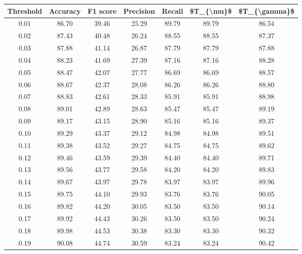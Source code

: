 \begin{tabular}{|c|c|c|c|c|c|c|}
\hline
 Threshold &  Accuracy &  F1 score &  Precision &  Recall &  \$T\_\{\textbackslash mu\}\$ &  \$T\_\{\textbackslash gamma\}\$ \\
\hline
      0.01 &     86.70 &     39.46 &      25.29 &   89.79 &      89.79 &         86.54 \\
      0.02 &     87.43 &     40.48 &      26.24 &   88.55 &      88.55 &         87.37 \\
      0.03 &     87.88 &     41.14 &      26.87 &   87.79 &      87.79 &         87.88 \\
      0.04 &     88.23 &     41.69 &      27.39 &   87.16 &      87.16 &         88.28 \\
      0.05 &     88.47 &     42.07 &      27.77 &   86.69 &      86.69 &         88.57 \\
      0.06 &     88.67 &     42.37 &      28.08 &   86.26 &      86.26 &         88.80 \\
      0.07 &     88.83 &     42.61 &      28.33 &   85.91 &      85.91 &         88.98 \\
      0.08 &     89.01 &     42.89 &      28.63 &   85.47 &      85.47 &         89.19 \\
      0.09 &     89.17 &     43.15 &      28.90 &   85.16 &      85.16 &         89.37 \\
      0.10 &     89.29 &     43.37 &      29.12 &   84.98 &      84.98 &         89.51 \\
      0.11 &     89.38 &     43.52 &      29.27 &   84.75 &      84.75 &         89.62 \\
      0.12 &     89.46 &     43.59 &      29.39 &   84.40 &      84.40 &         89.71 \\
      0.13 &     89.56 &     43.77 &      29.58 &   84.20 &      84.20 &         89.83 \\
      0.14 &     89.67 &     43.97 &      29.78 &   83.97 &      83.97 &         89.96 \\
      0.15 &     89.75 &     44.10 &      29.93 &   83.76 &      83.76 &         90.05 \\
      0.16 &     89.82 &     44.20 &      30.05 &   83.50 &      83.50 &         90.14 \\
      0.17 &     89.92 &     44.43 &      30.26 &   83.50 &      83.50 &         90.24 \\
      0.18 &     89.98 &     44.53 &      30.38 &   83.30 &      83.30 &         90.32 \\
      0.19 &     90.08 &     44.74 &      30.59 &   83.24 &      83.24 &         90.42 \\

\end{tabular}
